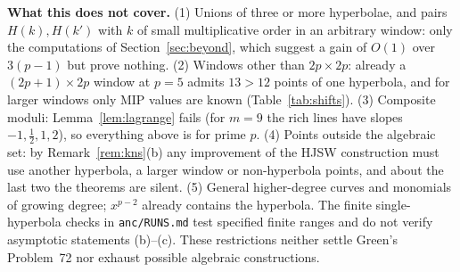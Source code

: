 \noindent\textbf{What this does not cover.}  (1) Unions of three or more hyperbolae, and pairs $H(k),H(k')$ with $k$ of small multiplicative order
in an arbitrary window: only the computations of Section~\ref{sec:beyond}, which suggest a gain of $O(1)$ over $3(p-1)$ but prove nothing.
(2) Windows other than $2p\times2p$: already a $(2p+1)\times2p$ window at $p=5$ admits $13>12$ points of one hyperbola, and for larger windows
only MIP values are known (Table~\ref{tab:shifts}).  (3) Composite moduli: Lemma~\ref{lem:lagrange} fails (for $m=9$ the rich lines have slopes
$-1,\tfrac12,1,2$), so everything above is for prime $p$.  (4) Points outside the algebraic set: by Remark~\ref{rem:kns}(b) any improvement of the
HJSW construction must use another hyperbola, a larger window or non-hyperbola points, and about the last two the theorems are silent.
(5) General higher-degree curves and monomials of growing degree; $x^{p-2}$ already contains the hyperbola.
The finite single-hyperbola checks in \texttt{anc/RUNS.md} test specified finite ranges and do not verify asymptotic statements (b)--(c).
These restrictions neither settle Green's Problem~72 nor exhaust possible algebraic constructions.
